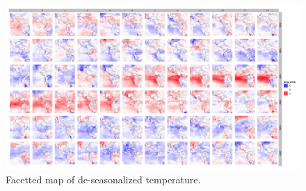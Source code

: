 \documentclass[oneside]{article}
\begin{document}
\begin{figure}[htp]
\centerline{\includegraphics[width=6in]{nasa-colored-map.png}}
\caption{Facetted map of de-seasonalized temperature.}
\label{fig:facetted-map}
\end{figure}

\end{document}
